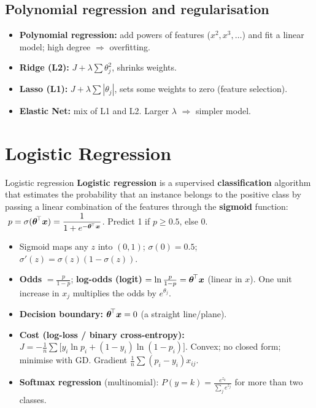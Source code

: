\subsection{Polynomial regression and regularisation}
\begin{itemize}
  \item \textbf{Polynomial regression:} add powers of features ($x^2,x^3,\dots$) and fit a linear model; high degree $\Rightarrow$ overfitting.
  \item \textbf{Ridge (L2):} $J+\lambda\sum\theta_j^2$, shrinks weights.
  \item \textbf{Lasso (L1):} $J+\lambda\sum|\theta_j|$, sets some weights to zero (feature selection).
  \item \textbf{Elastic Net:} mix of L1 and L2. Larger $\lambda$ $\Rightarrow$ simpler model.
\end{itemize}


\section{Logistic Regression}
\begin{dfn}{Logistic regression}
\textbf{Logistic regression} is a supervised \textbf{classification} algorithm that estimates the probability that an instance belongs to the positive class by passing a linear combination of the features through the \textbf{sigmoid} function:
$\ p=\sigma(\vect\theta^{\!\top}\vect x)=\dfrac1{1+e^{-\vect\theta^{\!\top}\vect x}}$. Predict 1 if $p\ge0.5$, else 0.
\end{dfn}

\begin{itemize}
  \item Sigmoid maps any $z$ into $(0,1)$; $\sigma(0)=0.5$; $\sigma'(z)=\sigma(z)(1-\sigma(z))$.
  \item \textbf{Odds} $=\frac p{1-p}$; \textbf{log-odds (logit)} $=\ln\frac p{1-p}=\boldsymbol{\theta}^{\!\top}\boldsymbol{x}$ (linear in $x$). One unit increase in $x_j$ multiplies the odds by $e^{\theta_j}$.
  \item \textbf{Decision boundary:} $\boldsymbol{\theta}^{\!\top}\boldsymbol{x}=0$ (a straight line/plane).
  \item \textbf{Cost (log-loss / binary cross-entropy):} $J=-\frac1n\sum\big[y_i\ln p_i+(1-y_i)\ln(1-p_i)\big]$. Convex; no closed form; minimise with GD. Gradient $\frac1n\sum(p_i-y_i)x_{ij}$.
  \item \textbf{Softmax regression} (multinomial): $P(y=k)=\frac{e^{z_k}}{\sum_je^{z_j}}$ for more than two classes.
\end{itemize}

